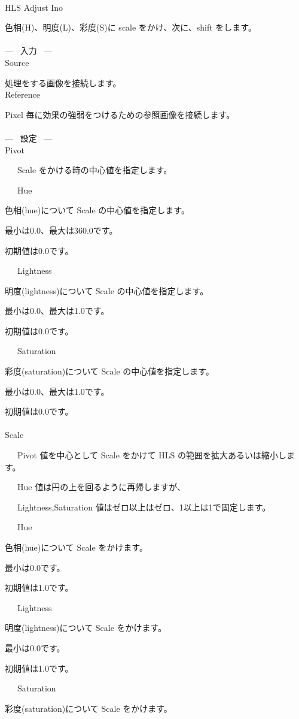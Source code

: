 \documentclass[a4paper,12pt]{article}
\begin{document}
\thispagestyle{empty}

\Large
\noindent \\
HLS Adjust Ino\medskip
\par
\normalsize
色相(H)、明度(L)、彩度(S)に scale をかけ、次に、shift をします。\\
\\
--- \ 入力 \ ---\\
Source\par
処理をする画像を接続します。\\
Reference\par
Pixel 毎に効果の強弱をつけるための参照画像を接続します。\\
\\
--- \ 設定 \ ---\\
Pivot\par
\noindent \ \ \, Scale をかける時の中心値を指定します。\\
\par
\noindent \ \ \, Hue\par
色相(hue)について Scale の中心値を指定します。\par
最小は0.0、最大は360.0です。\par
初期値は0.0です。\par
\noindent \ \ \, Lightness\par
明度(lightness)について Scale の中心値を指定します。\par
最小は0.0、最大は1.0です。\par
初期値は0.0です。\par
\noindent \ \ \, Saturation\par
彩度(saturation)について Scale の中心値を指定します。\par
最小は0.0、最大は1.0です。\par
初期値は0.0です。\\
\\
Scale\par
\noindent \ \ \, Pivot 値を中心として Scale をかけて HLS の範囲を拡大あるいは縮小します。\par
\noindent \ \ \, Hue 値は円の上を回るように再帰しますが、\par
\noindent \ \ \, Lightness,Saturation 値はゼロ以上はゼロ、1以上は1で固定します。\\
\par
\noindent \ \ \, Hue\par
色相(hue)について Scale をかけます。\par
最小は0.0です。\par
初期値は1.0です。\par
\noindent \ \ \, Lightness\par
明度(lightness)について Scale をかけます。\par
最小は0.0です。\par
初期値は1.0です。\par
\noindent \ \ \, Saturation\par
彩度(saturation)について Scale をかけます。
\end{document}
